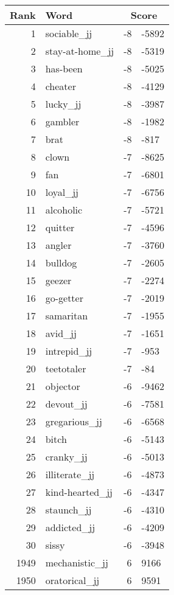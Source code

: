 \begin{longtable}[!htbp]{| rlr@{.}l |}
    \hline
    \textbf{Rank} & \textbf{Word} & \multicolumn{2}{c|}{\textbf{Score}} \\
    \hline
    \endhead
    1 & sociable\_jj & -8 & -5892 \\
    2 & stay-at-home\_jj & -8 & -5319 \\
    3 & has-been & -8 & -5025 \\
    4 & cheater & -8 & -4129 \\
    5 & lucky\_jj & -8 & -3987 \\
    6 & gambler & -8 & -1982 \\
    7 & brat & -8 & -817 \\
    8 & clown & -7 & -8625 \\
    9 & fan & -7 & -6801 \\
    10 & loyal\_jj & -7 & -6756 \\
    11 & alcoholic & -7 & -5721 \\
    12 & quitter & -7 & -4596 \\
    13 & angler & -7 & -3760 \\
    14 & bulldog & -7 & -2605 \\
    15 & geezer & -7 & -2274 \\
    16 & go-getter & -7 & -2019 \\
    17 & samaritan & -7 & -1955 \\
    18 & avid\_jj & -7 & -1651 \\
    19 & intrepid\_jj & -7 & -953 \\
    20 & teetotaler & -7 & -84 \\
    21 & objector & -6 & -9462 \\
    22 & devout\_jj & -6 & -7581 \\
    23 & gregarious\_jj & -6 & -6568 \\
    24 & bitch & -6 & -5143 \\
    25 & cranky\_jj & -6 & -5013 \\
    26 & illiterate\_jj & -6 & -4873 \\
    27 & kind-hearted\_jj & -6 & -4347 \\
    28 & staunch\_jj & -6 & -4310 \\
    29 & addicted\_jj & -6 & -4209 \\
    30 & sissy & -6 & -3948 \\
    1949 & mechanistic\_jj & 6 & 9166 \\
    1950 & oratorical\_jj & 6 & 9591 \\

\end{longtable}
